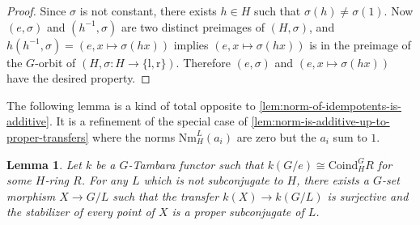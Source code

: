 \documentclass[11pt,dvipsnames]{amsart}
\newtheorem{lemma}[theorem]{Lemma}
\theoremstyle{BoldRemark}
\begin{document}
\begin{proof}
	Since $\sigma$ is not constant, there exists $h \in H$ such that $\sigma(h) \neq \sigma(1)$. Now $(e, \sigma)$ and $(h^{-1},\sigma)$ are two distinct preimages of $(H,\sigma)$, and $h(h^{-1},\sigma) = (e,x \mapsto \sigma(hx))$ implies $(e,x\mapsto \sigma(hx))$ is in the preimage of the $G$-orbit of $(H, \sigma : H \rightarrow \{ \mathrm{l} , \mathrm{r} \})$. Therefore $(e,\sigma)$ and $(e,x \mapsto \sigma(hx))$ have the desired property.
\end{proof}

The following lemma is a kind of total opposite to \cref{lem:norm-of-idempotents-is-additive}. It is a refinement of the special case of \cref{lem:norm-is-additive-up-to-proper-transfers} where the norms $\mathrm{Nm}_H^L(a_i)$ are zero but the $a_i$ sum to $1$.

\begin{lemma}\label{lem:coind-at-bottom-implies-surj-transfer}
	Let $k$ be a $G$-Tambara functor such that $k(G/e) \cong \mathrm{Coind}_H^G R$ for some $H$-ring $R$. For any $L$ which is not subconjugate to $H$, there exists a $G$-set morphism $X \rightarrow G/L$ such that the transfer $k(X) \rightarrow k(G/L)$ is surjective and the stabilizer of every point of $X$ is a proper subconjugate of $L$.
\end{lemma}
\end{document}
